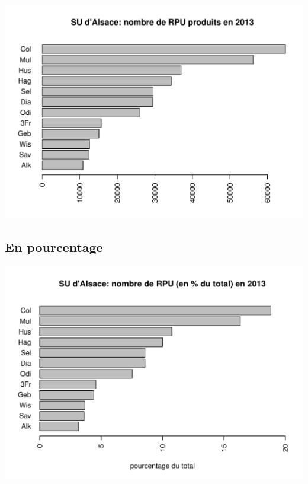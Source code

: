 \documentclass[12pt,english,french,twoside]{book}\usepackage[]{graphicx}\usepackage[]{color}
\makeatletter
\def\maxwidth{ %
  \ifdim\Gin@nat@width>\linewidth
    \linewidth
  \else
    \Gin@nat@width
  \fi
}
\newenvironment{knitrout}{}{} %
\makeatother
\begin{document}
\begin{center}
\begin{knitrout}
\color{fgcolor}
\includegraphics[width=\maxwidth]{figure/bplot_val_abs-1} 

\end{knitrout}
\label{fig:bplot_val_abs}
\end{center}

\subsection*{En pourcentage}



\begin{center}
\begin{knitrout}
\color{fgcolor}
\includegraphics[width=\maxwidth]{figure/bp_en_pourcentage-1} 

\end{knitrout}
\label{fig:bp_en_pourcentage}
\end{center}
\end{document}
